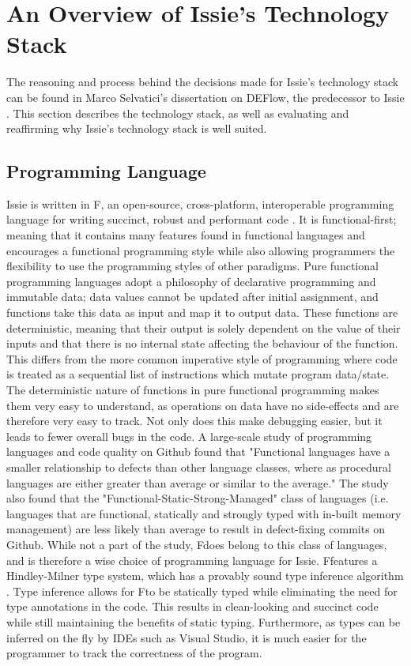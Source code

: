 \section{An Overview of Issie's Technology Stack} \label{sec:techstack}

The reasoning and process behind the decisions made for Issie's technology stack can be found in Marco Selvatici's dissertation on DEFlow, the predecessor to Issie \cite{marco_diss}. This section describes the technology stack, as well as evaluating and reaffirming why Issie's technology stack is well suited.

\subsection{Programming Language} \label{subsec:fsharp}
Issie is written in F\fsharp, an open-source, cross-platform, interoperable programming language for writing succinct, robust and performant code \cite{fsharp}. It is functional-first; meaning that it contains many features found in functional languages and encourages a functional programming style while also allowing programmers the flexibility to use the programming styles of other paradigms. Pure functional programming languages adopt a philosophy of declarative programming and immutable data; data values cannot be updated after initial assignment, and functions take this data as input and map it to output data. These functions are deterministic, meaning that their output is solely dependent on the value of their inputs and that there is no internal state affecting the behaviour of the function. This differs from the more common imperative style of programming where code is treated as a sequential list of instructions which mutate program data/state. The deterministic nature of functions in pure functional programming makes them very easy to understand, as operations on data have no side-effects and are therefore very easy to track. Not only does this make debugging easier, but it leads to fewer overall bugs in the code. A large-scale study of programming languages and code quality on Github \cite{functionaldebug} found that "Functional languages have a smaller relationship to defects than other language classes, where as procedural languages are either greater than average or similar to the average." The study also found that the "Functional-Static-Strong-Managed" class of languages (i.e. languages that are functional, statically and strongly typed with in-built memory management) are  less likely than average to result in defect-fixing commits on Github.
While not a part of the study, F\fsharp does belong to this class of languages, and is therefore a wise choice of programming language for Issie. F\fsharp features a Hindley-Milner type system, which has a provably sound type inference algorithm \cite{hm_typesis}. Type inference allows for F\fsharp to be statically typed while eliminating the need for type annotations in the code. This results in clean-looking and succinct code while still maintaining the benefits of static typing.  Furthermore, as types can be inferred on the fly by IDEs such as Visual Studio, it is much easier for the programmer to track the correctness of the program. 

